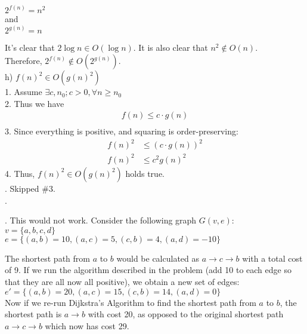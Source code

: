 \documentclass[12pt]{report}
\newcommand{\no}{\noindent}
\newcommand{\tab}{\hspace*{.6cm}}
\begin{document}
	\centering
	$2^{f(n)} = n^2$\\
	and\\
	$2^{g(n)} = n$\\
	\justify
	
	\tab It's clear that $2\log{n} \in O(\log{n})$. It is also clear that $n^2 \notin O(n)$.\\
	Therefore, $2^{f(n)} \notin O(2^{g(n)})$.\\
	
	\no h) 	$f(n)^2 \in O(g(n)^2)$\\
	\tab 1. Assume $\exists c, n_0; c > 0, \forall n \geq n_0$\\
	\tab 2. Thus we have 
	\begin{align*}
	f(n) \leq c \cdot g(n) \\
	\end{align*}
	\tab 3. Since everything is positive, and squaring is order-preserving:
	\begin{align*}
	f(n)^2 &\leq (c\cdot g(n))^2\\
	f(n)^2 &\leq c^2g(n)^2
	\end{align*}
	\tab 4. Thus, $f(n)^2 \in O(g(n)^2)$ holds true.\\

	\no 3. Skipped \#3.\\

	\no 4. \\

	\pagebreak

	\no 5. This would not work. Consider the following graph $G(v,e)$:\\
	
	\centering
	$v=\{a, b, c, d\}$ \\
	$e = \{(a,b) = 10, (a, c) = 5, (c, b) = 4, (a,d) = -10\}$\\ 
	\justify
	
	The shortest path from $a$ to $b$ would be calculated as $a\rightarrow c \rightarrow b$ with a total cost of 9. If we run the algorithm described in the problem (add 10 to each edge so that they are all now all positive), we obtain a new set of edges: \\
	
	\centering
	$e' = \{(a,b) = 20, (a,c) = 15, (c,b) = 14, (a,d) = 0\}$\\
	\justify
	Now if we re-run Dijkstra's Algorithm to find the shortest path from $a$ to $b$, the shortest path is $a\rightarrow b$ with cost 20, as opposed to the original shortest path $a\rightarrow c \rightarrow b$ which now has cost 29. \\
	
\end{document}
